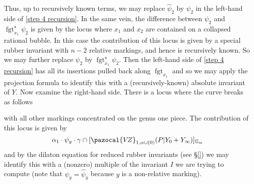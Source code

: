 \documentclass[11pt]{amsart}
\newcommand{\VZ}{\pazocal{V\!Z}}
\newcommand{\st}{\star}
\newcommand{\Gm}{\mathbb{G}_{\text{m}}}
\newcommand{\fgt}{\operatorname{fgt}}
\theoremstyle{definition}
\theoremstyle{definition}
\begin{document}
Thus, up to recursively known terms, we may replace $\hat\psi_2$ by $\psi_2$ in the left-hand side of \eqref{step 4 recursion}. In the same vein, the difference between $\psi_2$ and $\fgt_{x_1}^\st \psi_2$ is given by the locus where $x_1$ and $x_2$ are contained on a collapsed rational bubble. In this case the contribution of this locus is given by a special rubber invariant with $n-2$ relative markings, and hence is recursively known. So we may further replace $\psi_2$ by $\fgt_{x_1}^\st \psi_2$. Then the left-hand side of \eqref{step 4 recursion} has all its insertions pulled back along $\fgt_{x_1}$ and so we may apply the projection formula to identify this with a (recursively-known) absolute invariant of $Y$. Now examine the right-hand side. There is a locus where the curve breaks as follows
\begin{center}
\end{center}
with all other markings concentrated on the genus one piece. The contribution of this locus is given by
\begin{equation*} \alpha_1 \cdot \psi_y \cdot \gamma \cap [\VZ_{1,\alpha\cup(0)}(P|Y_0+Y_\infty)]_{\Gm} \end{equation*}
and by the dilaton equation for reduced rubber invariants (see \S \ref{}) we may identify this with a (nonzero) multiple of the invariant $I$ we are trying to compute (note that $\psi_y = \hat\psi_y$ because $y$ is a non-relative marking).
\end{document}
